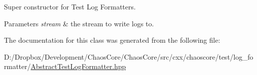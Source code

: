 Super constructor for Test Log Formatters. 


\begin{DoxyParams}{Parameters}
{\em stream} & the stream to write logs to. \\
\hline
\end{DoxyParams}


The documentation for this class was generated from the following file\+:\begin{DoxyCompactItemize}
\item 
D\+:/\+Dropbox/\+Development/\+Chaos\+Core/\+Chaos\+Core/src/cxx/chaoscore/test/log\+\_\+formatter/\hyperlink{_abstract_test_log_formatter_8hpp}{Abstract\+Test\+Log\+Formatter.\+hpp}\end{DoxyCompactItemize}
